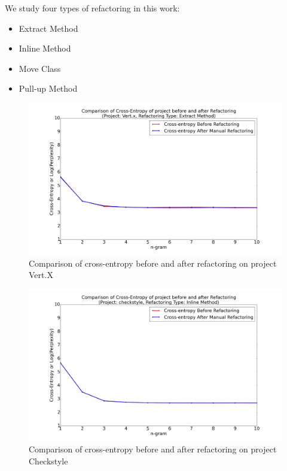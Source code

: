 \documentclass[conference]{IEEEtran}
\begin{document}
We study four types of refactoring in this work:
\begin{itemize}
\item Extract Method
\item Inline Method
\item Move Class
\item Pull-up Method
\end{itemize}


\begin{figure}[ht!]
\centering
\includegraphics[width=150mm]{../Result/Refactoring_ExtractMethod/Plots/vertX.png}
\caption{Comparison of cross-entropy before and after refactoring on project Vert.X}
\label{figure5}
\end{figure}
\begin{figure}[ht!]
\centering
\includegraphics[width=150mm]{../Result/Refactoring_InlineMethod/Plots/checkstyle.png}
\caption{Comparison of cross-entropy before and after refactoring on project Checkstyle}
\label{figure6}
\end{figure}
\end{document}
